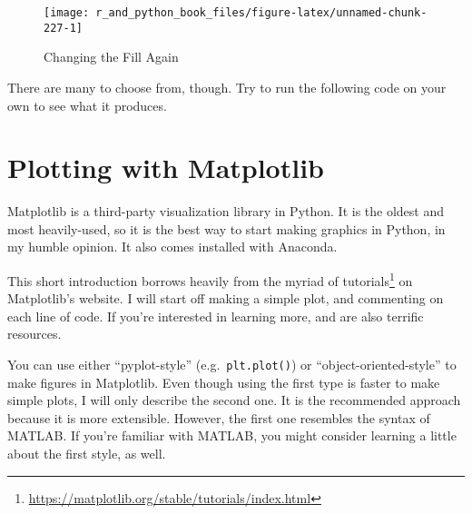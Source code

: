 \documentclass[
  12pt,
  krantz2]{krantz}
\makeatletter
\newenvironment{Shaded}{\begin{snugshade}}{\end{snugshade}}
\newcommand{\AttributeTok}[1]{\textcolor[rgb]{0.61,0.61,0.61}{#1}}
\newcommand{\DecValTok}[1]{\textcolor[rgb]{0.06,0.06,0.06}{#1}}
\newcommand{\FunctionTok}[1]{\textcolor[rgb]{0,0,0}{#1}}
\newcommand{\NormalTok}[1]{#1}
\newcommand{\OtherTok}[1]{\textcolor[rgb]{0.37,0.37,0.37}{#1}}
\newcommand{\SpecialCharTok}[1]{\textcolor[rgb]{0,0,0}{#1}}
\renewcommand{\href}[2]{#2\footnote{\url{#1}}}
\newenvironment{kframe}{%
\medskip{}
\setlength{\fboxsep}{.8em}
 \def\at@end@of@kframe{}%
 \ifinner\ifhmode%
  \def\at@end@of@kframe{\end{minipage}}%
  \begin{minipage}{\columnwidth}%
 \fi\fi%
 \def\FrameCommand##1{\hskip\@totalleftmargin \hskip-\fboxsep
 \colorbox{shadecolor}{##1}\hskip-\fboxsep
     \hskip-\linewidth \hskip-\@totalleftmargin \hskip\columnwidth}%
 \MakeFramed {\advance\hsize-\width
   \@totalleftmargin\z@ \linewidth\hsize
   \@setminipage}}%
 {\par\unskip\endMakeFramed%
 \at@end@of@kframe}
\renewenvironment{Shaded}{\begin{kframe}}{\end{kframe}}
\makeatother
\begin{document}
\begin{figure}

{\centering \texttt{[image: r\_and\_python\_book\_files/figure-latex/unnamed-chunk-227-1]} 

}

\caption{Changing the Fill Again}\label{fig:unnamed-chunk-227}
\end{figure}

There are many to choose from, though. Try to run the following code on your own to see what it produces.

\begin{Shaded}
\end{Shaded}

\hypertarget{plotting-with-matplotlib}{%
\section{Plotting with Matplotlib}\label{plotting-with-matplotlib}}

Matplotlib \citep{Hunter:2007} is a third-party visualization library in Python. It is the oldest and most heavily-used, so it is the best way to start making graphics in Python, in my humble opinion. It also comes installed with Anaconda.

This short introduction borrows heavily from the myriad of \href{https://matplotlib.org/stable/tutorials/index.html}{tutorials} on Matplotlib's website. I will start off making a simple plot, and commenting on each line of code. If you're interested in learning more, \citep{py_ds_handbook} and \citep{pandas_guy} are also terrific resources.

\begin{rmd-details}
You can use either ``pyplot-style'' (e.g.~\texttt{plt.plot()}) or ``object-oriented-style'' to make figures in Matplotlib. Even though using the first type is faster to make simple plots, I will only describe the second one. It is the recommended approach because it is more extensible. However, the first one resembles the syntax of MATLAB. If you're familiar with MATLAB, you might consider learning a little about the first style, as well.

\end{rmd-details}
\end{document}
